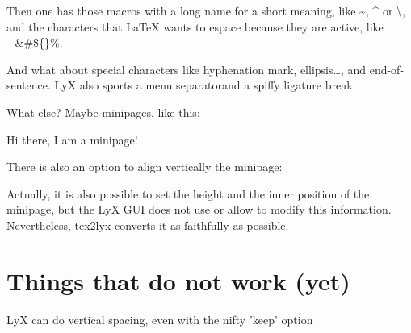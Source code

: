 \documentclass{article}
\begin{document}
Then one has those macros with a long name for a short meaning, like
\textasciitilde, \textasciicircum{} or \textbackslash{}, and the characters
that LaTeX wants to espace because they are active, like \_\&\#\$\{\}\%.

And what about special characters like hyphe\-nation mark,
ellipsis\ldots, and end-of-sentence\@. LyX also sports a menu
separator\lyxarrow and a spif\textcompwordmark fy ligature break.

What else? Maybe minipages, like this:
\begin{minipage}{10cm}
Hi there, I am a minipage!
\end{minipage}

There is also an option to align vertically the minipage:
\begin{minipage}[t]{0.3\columnwidth}
Actually, it is also possible to set the height and the inner position
of the minipage, but the LyX GUI does not use or allow to modify this
information. Nevertheless, tex2lyx converts it as faithfully as possible.
\end{minipage}


\section{Things that do not work (yet)}

\vspace*{1cm}
LyX can do vertical spacing, even with the nifty 'keep' option
\bigskip
\end{document}
